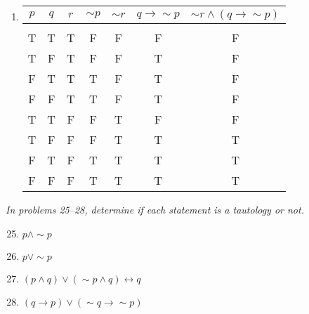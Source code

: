 \begin{enumerate}
\item 
\begin{center}
\begin{tabular}{|c | c | c | c | c | c | c|}
\hline
$p$ & $q$ & $r$ & $\sim p$ & $\sim r$ & $q \to \sim p$ & $\sim r \wedge (q \to \sim p)$\\
\hline
& & & & & &\\
T & T & T & F & F & F & F\\
T & F & T & F & F & T & F\\
F & T & T & T & F & T & F\\
F & F & T & T & F & T & F\\
T & T & F & F & T & F & F\\
T & F & F & F & T & T & T\\
F & T & F & T & T & T & T\\
F & F & F & T & T & T & T\\
\hline
\end{tabular}
\end{center}
\end{enumerate}

\emph{In problems 25--28, determine if each statement is a tautology or not.}
\begin{enumerate}
\setcounter{enumi}{24}

\item $p \wedge \sim p$ 

\item $p \vee \sim p$ 

\item $(p \wedge q) \vee (\sim p \wedge q) \leftrightarrow q$ 

\item $(q \to p) \vee (\sim q \to \sim p)$ 
\end{enumerate}
\pagebreak

